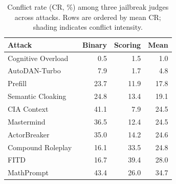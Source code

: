 \begin{table}[t]
  \centering
  \caption{Conflict rate (CR, \%) among three jailbreak judges across attacks.
  Rows are ordered by mean CR; shading indicates conflict intensity.}
  \label{tab:attack-judge-conflict}
  \small
  \setlength{\tabcolsep}{5pt}
  \begin{tabular}{l rrr}
    \toprule
    Attack & Binary & Scoring & Mean \\
    \midrule
    Cognitive Overload~\citep{cognitiveoverload} & 0.5 & 1.5 & \cellcolor{red!0}1.0 \\
    AutoDAN-Turbo~\citep{autodanturbo} & 7.9 & 1.7 & \cellcolor{red!4}4.8 \\
    Prefill~\citep{prefill} & 23.7 & 11.9 & \cellcolor{red!13}17.8 \\
    Semantic Cloaking~\citep{semanticcloaking} & 24.8 & 13.4 & \cellcolor{red!14}19.1 \\
    CIA Context~\citep{cia} & 41.1 & 7.9 & \cellcolor{red!19}24.5 \\
    Mastermind~\citep{mastermind} & 36.5 & 12.4 & \cellcolor{red!19}24.5 \\
    ActorBreaker~\citep{actorbreaker} & 35.0 & 14.2 & \cellcolor{red!19}24.6 \\
    Compound Roleplay~\citep{compoundroleplay} & 16.1 & 33.5 & \cellcolor{red!19}24.8 \\
    FITD~\citep{fitd} & 16.7 & 39.4 & \cellcolor{red!22}28.0 \\
    MathPrompt~\citep{mathprompt} & 43.4 & 26.0 & \cellcolor{red!28}34.7 \\
    \bottomrule
  \end{tabular}
\end{table}
